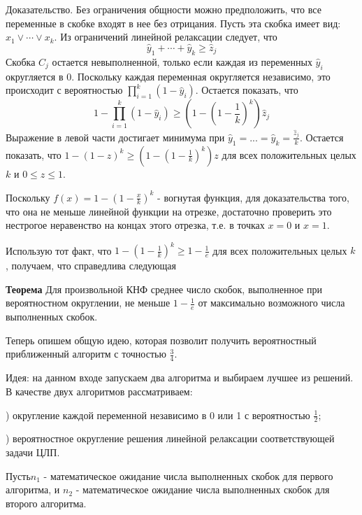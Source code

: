 \begin{problem}
\noindent Доказательство. Без ограничения общности можно предположить, что все переменные в скобке входят в нее без отрицания. Пусть эта скобка имеет вид: $x_{1} \vee \cdots \vee x_{k} $. Из ограничений линейной релаксации следует, что
\[\hat{y}_{1} +\cdots +\hat{y}_{k} \ge \hat{z}_{j} \] 
Скобка $C_{j} $ остается невыполненной, только если каждая из переменных $\hat{y}_{i} $ округляется в 0. Поскольку каждая переменная округляется независимо, это происходит с вероятностью $\prod _{i=1}^{k}(1-\hat{y}_{i} ) $. Остается показать, что
\[1-\prod _{i=1}^{k}(1-\hat{y}_{i} ) \ge \left(1-\left(1-\frac{1}{k} \right)^{k} \right)\hat{z}_{j} \] 
Выражение в левой части достигает минимума при $\hat{y}_{1} =...=\hat{y}_{k} =\frac{\hat{z}_{j} }{k} $. Остается показать, что $1-(1-z)^{k} \ge \left(1-\left(1-\frac{1}{k} \right)^{k} \right)z$ для всех положительных целых $k$ и $0\le z\le 1$.

\noindent Поскольку $f(x)=1-\left(1-\frac{x}{k} \right)^{k} $ - вогнутая функция, для доказательства того, что она не меньше линейной функции на отрезке, достаточно проверить это нестрогое неравенство на концах этого отрезка, т.е. в точках $x=0$ и $x=1$.

\noindent Использую тот факт, что $1-\left(1-\frac{1}{k} \right)^{k} \ge 1-\frac{1}{e} $ для всех положительных целых $k$, получаем, что справедлива следующая 

\noindent \textbf{Теорема} Для произвольной КНФ среднее число скобок, выполненное при вероятностном округлении, не меньше $1-\frac{1}{e} $ от максимально возможного числа выполненных скобок.

\noindent Теперь опишем общую идею, которая позволит получить вероятностный приближенный алгоритм с точностью $\frac{3}{4} $.

\noindent Идея: на данном входе запускаем два алгоритма и выбираем лучшее из решений. В качестве двух алгоритмов рассматриваем:

) округление каждой переменной  независимо в 0 или 1 с вероятностью $\frac{1}{2} $;

) вероятностное округление решения линейной релаксации соответствующей задачи ЦЛП.

\noindent 

\noindent Пусть$n_{1} $ - математическое ожидание числа выполненных скобок для первого алгоритма, и $n_{2} $ - математическое ожидание числа выполненных скобок для второго алгоритма.


\end{problem}
